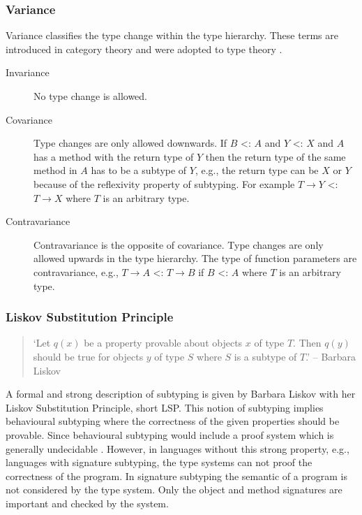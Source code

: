\subsubsection{Variance}
Variance classifies the type change within the type hierarchy. These
terms are introduced in category theory and were adopted to type theory
\cite{pierce_basic_1991}.

\begin{description}
	\item[Invariance] No type change is allowed.
	\item[Covariance] Type changes are only allowed downwards. If $B$
	<: $A$ and $Y$ <: $X$ and $A$ has a method with the return
	type of $Y$ then the return type of the same method in $A$
	has to be a subtype of $Y$, e.g., the return type can be $X$
	or $Y$ because of the reflexivity property of subtyping. For
	example $T \rightarrow Y$ <: $T \rightarrow X$ where $T$ is an
	arbitrary type.
	\item[Contravariance] Contravariance is the opposite of
	covariance. Type changes are only allowed upwards in the type
	hierarchy. The type of function parameters are contravariance,
	e.g., $T \rightarrow A$ <: $T \rightarrow B$ if $B$ <: $A$ where
	$T$ is an arbitrary type.
\end{description}

\subsubsection{Liskov Substitution Principle}
\begin{quotation}
`Let $q(x)$ be a property provable about objects $x$ of type $T$. Then
$q(y)$ should be true for objects $y$ of type $S$ where $S$ is a subtype
of $T$.' -- Barbara Liskov \cite{liskov_behavioral_2001}
\end{quotation}

A formal and strong description of subtyping is given by Barbara
Liskov with her Liskov Substitution Principle, short LSP. This notion
of subtyping implies behavioural subtyping where the correctness
of the given properties should be provable. Since behavioural
subtyping would include a proof system which is generally undecidable
\cite{poll_behavioural_1998}. However, in languages without this strong
property, e.g., languages with signature subtyping, the type systems
can not proof the correctness of the program. In signature subtyping
the semantic of a program is not considered by the type system. Only
the object and method signatures are important and checked by the system.

